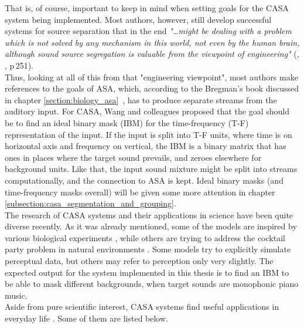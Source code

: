 That is, of course, important to keep in mind when setting goals for the CASA system being implemented. Most authors, however, still develop successful systems for source separation that in the end \textit{"\dots{}might be dealing with a problem which is not solved by any mechanism in this world, not even by the human brain, although sound source segregation is valuable from the viewpoint of engineering"} (\cite{Goto2004}, \cite{Wang2006}, p\,251).\\

Thus, looking at all of this from that "engineering viewpoint", most authors make references to the goals of ASA, which, according to the Bregman's book discussed in chapter \ref{section:biology_asa}~\cite{Bregman1990}, has to produce separate streams from the auditory input. For CASA, Wang and colleagues \cite{Wang2005} proposed that the goal should be to find an ideal binary mask (IBM) for the time-frequency (T-F) representation of the input. If the input is split into T-F units, where time is on horizontal axis and frequency on vertical, the IBM is a binary matrix that has ones in places where the target sound prevails, and zeroes elsewhere for background units. Like that, the input sound mixture might be split into streams computationally, and the connection to ASA is kept. Ideal binary masks (and time-frequency masks overall) will be given some more attention in chapter \ref{subsection:casa_segmentation_and_grouping}.\\

The research of CASA systems and their applications in science \cite{Szabo2016} have been quite diverse recently. As it was already mentioned, some of the models are inspired by various biological experiments \cite{Wang2008}\cite{Boes2011}, while others are trying to address the cocktail party problem in natural environments \cite{Elhilali2008}. Some models try to explicitly simulate perceptual data, but others may refer to perception only very slightly. The expected output for the system implemented in this thesis is to find an IBM to be able to mask different backgrounds, when target sounds are monophonic piano music.\\

Aside from pure scientific interest, CASA systems find useful applications in everyday life \cite{Wang2006}. Some of them are listed below.

